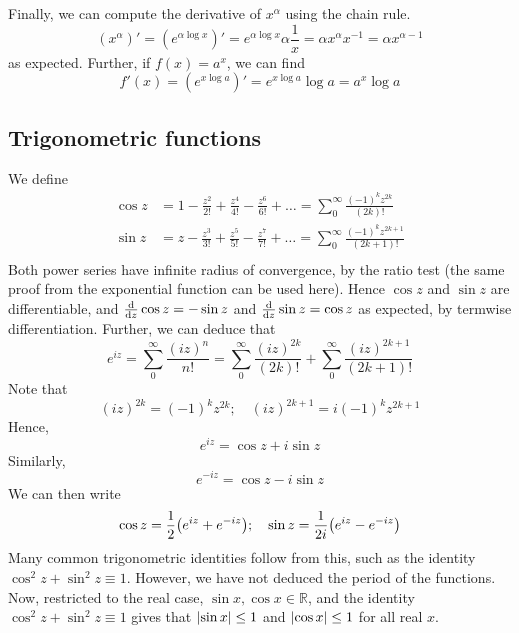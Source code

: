 Finally, we can compute the derivative of \(x^\alpha\) using the chain rule.
\[
	(x^\alpha)' = \left( e^{\alpha \log x} \right)' = e^{\alpha \log x} \alpha \frac{1}{x} = \alpha x^\alpha x^{-1} = \alpha x^{\alpha - 1}
\]
as expected.
Further, if \(f(x) = a^x\), we can find
\[
	f'(x) = \left( e^{x \log a} \right)' = e^{x \log a} \log a = a^x \log a
\]

\subsection{Trigonometric functions}
We define
\begin{align*}
	\cos z & = 1 - \frac{z^2}{2!} + \frac{z^4}{4!} - \frac{z^6}{6!} + \dots = \sum_0^\infty \frac{(-1)^k z^{2k}}{(2k)!}     \\
	\sin z & = z - \frac{z^3}{3!} + \frac{z^5}{5!} - \frac{z^7}{7!} + \dots = \sum_0^\infty \frac{(-1)^k z^{2k+1}}{(2k+1)!} \\
\end{align*}
Both power series have infinite radius of convergence, by the ratio test (the same proof from the exponential function can be used here).
Hence \(\cos z\) and \(\sin z\) are differentiable, and \(\dv{z}\cos z = -\sin z\) and \(\dv{z}\sin z = \cos z\) as expected, by termwise differentiation.
Further, we can deduce that
\[
	e^{iz} = \sum_0^\infty \frac{(iz)^n}{n!} = \sum_0^\infty \frac{(iz)^{2k}}{(2k)!} + \sum_0^\infty \frac{(iz)^{2k+1}}{(2k+1)!}
\]
Note that
\[
	(iz)^{2k} = (-1)^k z^{2k};\quad (iz)^{2k+1} = i (-1)^k z^{2k+1}
\]
Hence,
\[
	e^{iz} = \cos z + i \sin z
\]
Similarly,
\[
	e^{-iz} = \cos z - i \sin z
\]
We can then write
\[
	\cos z = \frac{1}{2}\qty( e^{iz} + e^{-iz} );\quad \sin z = \frac{1}{2i}\qty( e^{iz} - e^{-iz} )
\]
Many common trigonometric identities follow from this, such as the identity \(\cos^2 z + \sin^2 z \equiv 1\).
However, we have not deduced the period of the functions.
Now, restricted to the real case, \(\sin x, \cos x \in \mathbb R\), and the identity \(\cos^2 z + \sin^2 z \equiv 1\) gives that \(\abs{\sin x} \leq 1\) and \(\abs{\cos x} \leq 1\) for all real \(x\).


